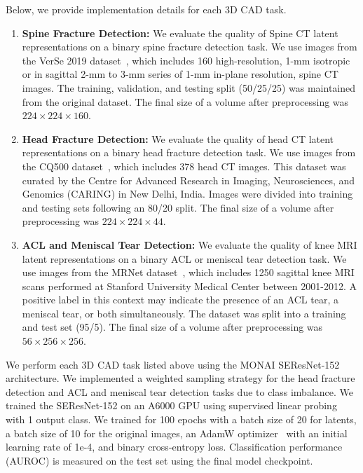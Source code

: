 Below, we provide implementation details for each 3D CAD task.
\begin{enumerate}
    \item \textbf{Spine Fracture Detection:} We evaluate the quality of Spine CT latent representations on a binary spine fracture detection task. We use images from the VerSe 2019 dataset~\cite{loffler2020vertebral}, which includes 160 high-resolution, 1-mm isotropic or in sagittal 2-mm to 3-mm series of 1-mm in-plane resolution, spine CT images. The training, validation, and testing split (50/25/25) was maintained from the original dataset. The final size of a volume after preprocessing was $224 \times 224 \times 160$. 
    \item \textbf{Head Fracture Detection:} We evaluate the quality of head CT latent representations on a binary head fracture detection task. We use images from the CQ500 dataset~\cite{chilamkurthy2018development}, which includes 378 head CT images. This dataset was curated by the Centre for Advanced Research in Imaging, Neurosciences, and Genomics (CARING) in New Delhi, India. Images were divided into training and testing sets following an 80/20 split. The final size of a volume after preprocessing was $224 \times 224 \times 44$. 
    \item \textbf{ACL and Meniscal Tear Detection:} We evaluate the quality of knee MRI latent representations on a binary ACL or meniscal tear detection task. We use images from the MRNet dataset~\cite{bien2018deep}, which includes 1250 sagittal knee MRI scans performed at Stanford University Medical Center between 2001-2012. A positive label in this context may indicate the presence of an ACL tear, a meniscal tear, or both simultaneously. The dataset was split into a training and test set (95/5). The final size of a volume after preprocessing was $56 \times 256 \times 256$.
\end{enumerate}

We perform each 3D CAD task listed above using the MONAI SEResNet-152~\cite{hu2018squeeze} architecture. We implemented a weighted sampling strategy for the head fracture detection and ACL and meniscal tear detection tasks due to class imbalance. We trained the SEResNet-152 on an A6000 GPU using supervised linear probing with 1 output class. We trained for 100 epochs with a batch size of 20 for latents, a batch size of 10 for the original images, an AdamW optimizer~\cite{adamw} with an initial learning rate of 1e-4, and binary cross-entropy loss. Classification performance (AUROC) is measured on the test set using the final model checkpoint.

